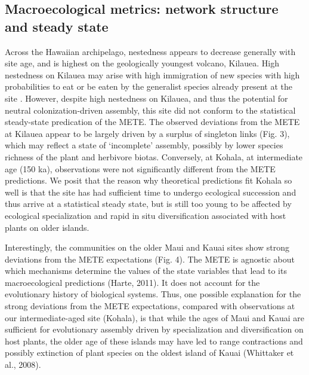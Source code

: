 \subsection{Macroecological metrics: network structure and steady
state}

Across the Hawaiian archipelago, nestedness appears to decrease
generally with site age, and is highest on the geologically youngest
volcano, Kilauea. High nestedness on Kilauea may arise with high
immigration of new species with high probabilities to eat or be eaten
by the generalist species already present at the site
\citep{bascompte2007}. However, despite high nestedness on Kilauea,
and thus the potential for neutral colonization-driven assembly, this
site did not conform to the statistical steady-state predication of
the METE. The observed deviations from the METE at Kilauea appear to
be largely driven by a surplus of singleton links (Fig. 3), which may
reflect a state of ‘incomplete’ assembly, possibly by lower species
richness of the plant and herbivore biotas. Conversely, at Kohala, at
intermediate age (150 ka), observations were not significantly
different from the METE predictions. We posit that the reason why
theoretical predictions fit Kohala so well is that the site has had
sufficient time to undergo ecological succession and thus arrive at a
statistical steady state, but is still too young to be affected by
ecological specialization and rapid in situ diversification associated
with host plants on older islands.

Interestingly, the communities on the older Maui and Kauai sites show
strong deviations from the METE expectations (Fig. 4). The METE is
agnostic about which mechanisms determine the values of the state
variables that lead to its macroecological predictions (Harte,
2011). It does not account for the evolutionary history of biological
systems. Thus, one possible explanation for the strong deviations from
the METE expectations, compared with observations at our
intermediate-aged site (Kohala), is that while the ages of Maui and
Kauai are sufficient for evolutionary assembly driven by
specialization and diversification on host plants, the older age of
these islands may have led to range contractions and possibly
extinction of plant species on the oldest island of Kauai (Whittaker
et al., 2008).

